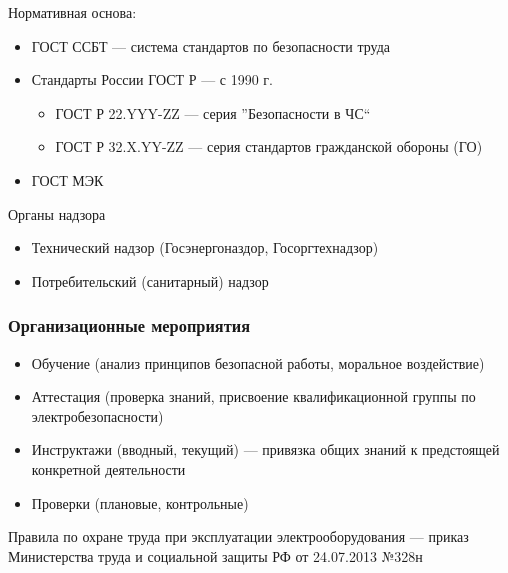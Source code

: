 \documentclass[a4paper, 14pt]{extarticle}
\begin{document}
Нормативная основа:
\begin{itemize}
    \item ГОСТ ССБТ --- система стандартов по безопасности труда
    \item Стандарты России ГОСТ Р --- с 1990 г.
    \begin{itemize}
        \item ГОСТ Р 22.YYY-ZZ --- серия ''Безопасности в ЧС``
        \item ГОСТ Р 32.X.YY-ZZ --- серия стандартов гражданской обороны (ГО)
    \end{itemize}
    \item ГОСТ МЭК
\end{itemize}

Органы надзора
\begin{itemize}
    \item Технический надзор (Госэнергоназдор, Госоргтехнадзор)
    \item Потребительский (санитарный) надзор
\end{itemize}

\subsubsection*{Организационные мероприятия}
\begin{itemize}
    \item Обучение (анализ принципов безопасной работы, моральное воздействие)
    \item Аттестация (проверка знаний, присвоение квалификационной группы по электробезопасности)
    \item Инструктажи (вводный, текущий) --- привязка общих знаний к предстоящей конкретной деятельности
    \item Проверки (плановые, контрольные)
\end{itemize}
Правила по охране труда при эксплуатации электрооборудования --- приказ Министерства труда и социальной защиты РФ от 24.07.2013 №328н
\end{document}
